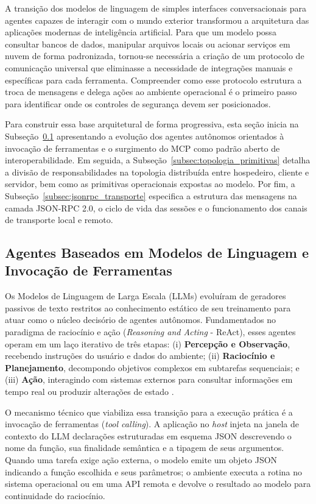 A transição dos modelos de linguagem de simples interfaces conversacionais para agentes capazes de interagir com o mundo exterior transformou a arquitetura das aplicações modernas de inteligência artificial. Para que um modelo possa consultar bancos de dados, manipular arquivos locais ou acionar serviços em nuvem de forma padronizada, tornou-se necessária a criação de um protocolo de comunicação universal que eliminasse a necessidade de integrações manuais e específicas para cada ferramenta. Compreender como esse protocolo estrutura a troca de mensagens e delega ações ao ambiente operacional é o primeiro passo para identificar onde os controles de segurança devem ser posicionados.

Para construir essa base arquitetural de forma progressiva, esta seção inicia na Subseção~\ref{subsec:agentes_tool_calling} apresentando a evolução dos agentes autônomos orientados à invocação de ferramentas e o surgimento do MCP como padrão aberto de interoperabilidade. Em seguida, a Subseção~\ref{subsec:topologia_primitivas} detalha a divisão de responsabilidades na topologia distribuída entre hospedeiro, cliente e servidor, bem como as primitivas operacionais expostas ao modelo. Por fim, a Subseção~\ref{subsec:jsonrpc_transporte} especifica a estrutura das mensagens na camada JSON-RPC 2.0, o ciclo de vida das sessões e o funcionamento dos canais de transporte local e remoto.

\subsection{Agentes Baseados em Modelos de Linguagem e Invocação de Ferramentas}
\label{subsec:agentes_tool_calling}

Os Modelos de Linguagem de Larga Escala (LLMs) evoluíram de geradores passivos de texto restritos ao conhecimento estático de seu treinamento para atuar como o núcleo decisório de agentes autônomos. Fundamentados no paradigma de raciocínio e ação (\textit{Reasoning and Acting} - ReAct), esses agentes operam em um laço iterativo de três etapas: (i) \textbf{Percepção e Observação}, recebendo instruções do usuário e dados do ambiente; (ii) \textbf{Raciocínio e Planejamento}, decompondo objetivos complexos em subtarefas sequenciais; e (iii) \textbf{Ação}, interagindo com sistemas externos para consultar informações em tempo real ou produzir alterações de estado \cite{singh2026mcpsecure}.

O mecanismo técnico que viabiliza essa transição para a execução prática é a invocação de ferramentas (\textit{tool calling}). A aplicação no \textit{host} injeta na janela de contexto do LLM declarações estruturadas em esquema JSON descrevendo o nome da função, sua finalidade semântica e a tipagem de seus argumentos. Quando uma tarefa exige ação externa, o modelo emite um objeto JSON indicando a função escolhida e seus parâmetros; o ambiente executa a rotina no sistema operacional ou em uma API remota e devolve o resultado ao modelo para continuidade do raciocínio.

